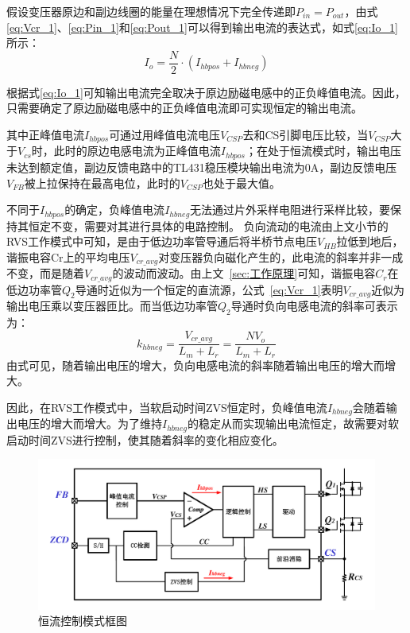 假设变压器原边和副边线圈的能量在理想情况下完全传递即$P_{in}=P_{out}$，由式\eqref{eq:Vcr_1}、\eqref{eq:Pin_1}和\eqref{eq:Pout_1}可以得到输出电流的表达式，如式\eqref{eq:Io_1}所示：
\begin{equation}
    \label{eq:Io_1}
    I_o=\frac{N}{2}\cdot(I_{hbpos} + I_{hbneg})
\end{equation}

根据式\eqref{eq:Io_1}可知输出电流完全取决于原边励磁电感中的正负峰值电流。因此，只需要确定了原边励磁电感中的正负峰值电流即可实现恒定的输出电流。

其中正峰值电流$I_{hbpos}$可通过用峰值电流电压$V_{CSP}$去和CS引脚电压比较，当$V_{CSP}$大于$V_{cs}$时，此时的原边电感电流为正峰值电流$I_{hbpos}$；在处于恒流模式时，输出电压未达到额定值，副边反馈电路中的TL431稳压模块输出电流为0A，副边反馈电压$V_{FB}$被上拉保持在最高电位，此时的$V_{CSP}$也处于最大值。

不同于$I_{hbpos}$的确定，负峰值电流$I_{hbneg}$无法通过片外采样电阻进行采样比较，要保持其恒定不变，需要对其进行具体的电路控制。
负向流动的电流由上文小节的RVS工作模式中可知，是由于低边功率管导通后将半桥节点电压$V_{HB}$拉低到地后，谐振电容Cr上的平均电压$V_{cr\_avg}$对变压器负向磁化产生的，此电流的斜率并非一成不变，而是随着$V_{cr\_avg}$的波动而波动。由上文~\ref{sec:工作原理}可知，谐振电容$C_r$在低边功率管$Q_2$导通时近似为一个恒定的直流源，公式~\ref{eq:Vcr_1}表明$V_{cr\_avg}$近似为输出电压乘以变压器匝比。而当低边功率管$Q_2$导通时负向电感电流的斜率可表示为：
\begin{equation}
    \label{eq:Ihbneg斜率公式}
    k_{hbneg}=\frac{V_{cr\_avg}}{L_m + L_r} = \frac{NV_o}{L_m + L_r}
\end{equation}
由式可见，随着输出电压的增大，负向电感电流的斜率随着输出电压的增大而增大。

因此，在RVS工作模式中，当软启动时间ZVS恒定时，负峰值电流$I_{hbneg}$会随着输出电压的增大而增大。为了维持$I_{hbneg}$的稳定从而实现输出电流恒定，故需要对软启动时间ZVS进行控制，使其随着斜率的变化相应变化。

\begin{figure}[htbp] 
    \centering
    \includegraphics[width=1.0\linewidth]{figures/恒流环路框图.pdf}
    \caption{恒流控制模式框图}
    \label{fig:恒流控制模式框图}
\end{figure}

